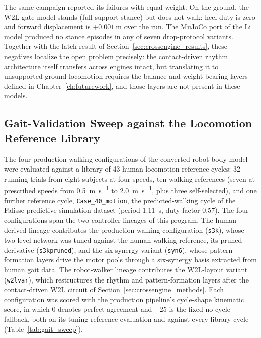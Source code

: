The same campaign reported its failures with equal weight. On the ground, the W2L gate model stands (full-support stance) but does not walk: heel duty is zero and forward displacement is $+\qty{0.001}{\meter}$ over the run. The MuJoCo port of the Li model produced no stance episodes in any of seven drop-protocol variants. Together with the latch result of Section~\ref{sec:crossengine_results}, these negatives localize the open problem precisely: the contact-driven rhythm architecture itself transfers across engines intact, but translating it to unsupported ground locomotion requires the balance and weight-bearing layers defined in Chapter~\ref{ch:futurework}, and those layers are not present in these models.

\subsection{Gait-Validation Sweep against the Locomotion Reference Library}\label{sec:gait_library_results}

The four production walking configurations of the converted robot-body model were evaluated against a library of 43 human locomotion reference cycles: 32 running trials from eight subjects at four speeds, ten walking references (seven at prescribed speeds from \qty{0.5}{\metre\per\second} to \qty{2.0}{\metre\per\second}, plus three self-selected), and one further reference cycle, \texttt{Case\_40\_motion}, the predicted-walking cycle of the Falisse predictive-simulation dataset (period \qty{1.11}{\second}, duty factor 0.57). The four configurations span the two controller lineages of this program. The human-derived lineage contributes the production walking configuration (\texttt{s3k}), whose two-level network was tuned against the human walking reference, its pruned derivative (\texttt{s3kpruned}), and the six-synergy variant (\texttt{syn6}), whose pattern-formation layers drive the motor pools through a six-synergy basis extracted from human gait data. The robot-walker lineage contributes the W2L-layout variant (\texttt{w2lvar}), which restructures the rhythm and pattern-formation layers after the contact-driven W2L circuit of Section~\ref{sec:crossengine_methods}. Each configuration was scored with the production pipeline's cycle-shape kinematic score, in which 0 denotes perfect agreement and $-25$ is the fixed no-cycle fallback, both on its tuning-reference evaluation and against every library cycle (Table~\ref{tab:gait_sweep}).

